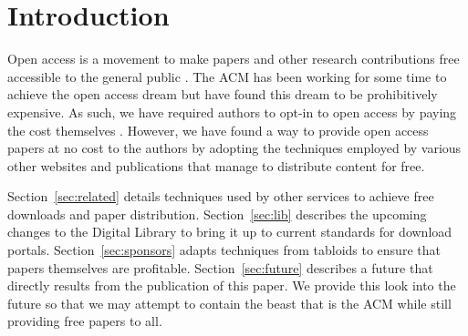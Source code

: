 \section{Introduction}
Open access is a movement to make papers and other research contributions free
accessible to the general public \cite{oa}.
The ACM has been working for some time to achieve the open access dream but
have found this dream to be prohibitively expensive.
As such, we have required authors to opt-in to open access by paying the cost
themselves \cite{auth}.
However, we have found a way to provide open access papers at no cost to the
authors by adopting the techniques employed by various other websites and
publications that manage to distribute content for free.

Section~\ref{sec:related} details techniques used by other services to achieve free
downloads and paper distribution.
Section~\ref{sec:lib} describes the upcoming changes to the Digital Library to
bring it up to current standards for download portals.
Section~\ref{sec:sponsors} adapts techniques from tabloids to ensure that papers
themselves are profitable.
Section~\ref{sec:future} describes a future that directly results from the
publication of this paper.
We provide this look into the future so that we may attempt to contain the
beast that is the ACM while still providing free papers to all.
